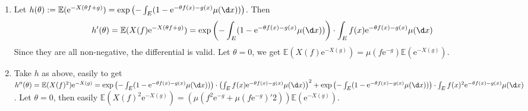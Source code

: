 \documentclass{ctexart}
\begin{document}
\begin{solution}
  \begin{enumerate}
    \item
      Let \(h(\theta):=\mathbb{E}(\mathrm{e}^{-X(\theta f + g)})=\exp\left(-\int_{E}(1-\mathrm{e}^{-\theta f(x) - g(x)} \mu(\d x))\right)\).
      Then
      \[
        h'(\theta)=\mathbb{E}(X(f)\mathrm{e}^{-X(\theta f + g)})=\exp\left(-\int_{E}(1-\mathrm{e}^{-\theta f(x) - g(x)} \mu(\d x))\right)\cdot \int_{E}f(x)\mathrm{e}^{-\theta f(x)-g(x)}\mu(\d x)
      \]
      Since they are all non-negative, the differential is valid.
      Let \(\theta = 0\), we get \(\mathbb{E}(X(f)\mathrm{e}^{-X(g)})=\mu(f \mathrm{e}^{-g})\mathbb{E}(\mathrm{e}^{-X(g)})\).
    \item Take \(h\) as above, easily to get \(h'' (\theta)=\mathbb{E}(X(f)^2)\mathrm{e}^{-X(g)}=\exp\left(-\int_{E}(1-\mathrm{e}^{-\theta f(x) - g(x)} \mu(\d x))\right)\cdot \left(\int_{E}f(x)\mathrm{e}^{-\theta f(x)-g(x)}\mu(\d x)\right)^2 + \exp\left(-\int_{E}(1-\mathrm{e}^{-\theta f(x) - g(x)} \mu(\d x))\right) \cdot \int_{E}f(x)^2 \mathrm{e}^{-\theta f(x) - g(x)}\mu(\d x)\).
      Let \(\theta =0\), then easily \(\mathbb{E}(X(f)^2 \mathrm{e}^{-X(g)})=(\mu(f^2 \mathrm{e}^{-g}+\mu(f \mathrm{e}^{-g})'2))\mathbb{E}(\mathrm{e}^{-X(g)})\).
  \end{enumerate}
\end{solution}
\end{document}
